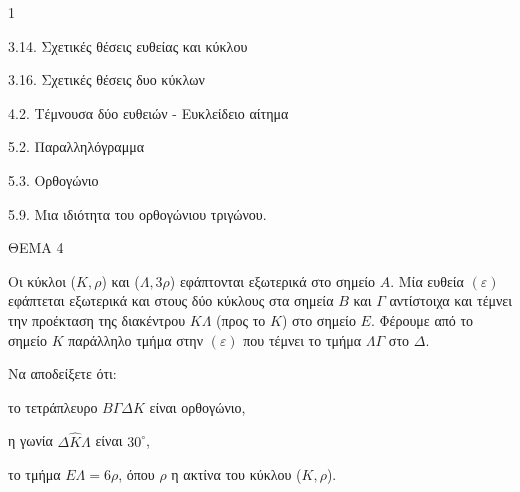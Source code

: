 \begin{ylh}{1}
    \item 3.14. Σχετικές θέσεις ευθείας και κύκλου
    \item 3.16. Σχετικές θέσεις δυο κύκλων
    \item 4.2. Τέμνουσα δύο ευθειών - Ευκλείδειο αίτημα
    \item 5.2. Παραλληλόγραμμα
    \item 5.3. Ορθογώνιο
    \item 5.9. Μια ιδιότητα του ορθογώνιου τριγώνου.
\end{ylh}

ΘΕΜΑ 4

Οι κύκλοι ($Κ, \rho$) και ($\Lambda, 3\rho$) εφάπτονται εξωτερικά στο σημείο $Α$. Μία ευθεία $(\varepsilon)$ εφάπτεται εξωτερικά και στους δύο κύκλους στα σημεία $Β$ και $\Gamma$ αντίστοιχα και τέμνει την προέκταση της διακέντρου $Κ\Lambda$ (προς το $Κ$) στο σημείο $Ε$. Φέρουμε από το σημείο $Κ$ παράλληλο τμήμα στην $(\varepsilon)$ που τέμνει το τμήμα $\Lambda\Gamma$ στο $\Delta$.

Να αποδείξετε ότι:

\begin{alist}
\item το τετράπλευρο $Β\Gamma\Delta Κ$ είναι ορθογώνιο, 
\item η γωνία $\Delta\widehat{Κ}\Lambda$ είναι $30^{\circ}$, 
\item το τμήμα $E\Lambda = 6\rho$, όπου $\rho$ η ακτίνα του κύκλου ($Κ, \rho$). 

\begin{center}
\end{center}
\end{alist}
